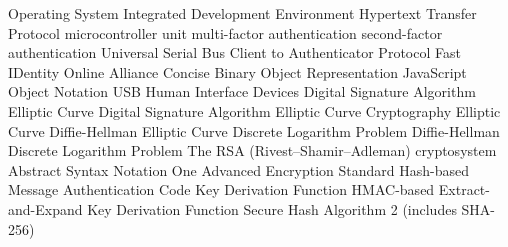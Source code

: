       {Operating System}
     {Integrated Development Environment}
    {Hypertext Transfer Protocol}
     {microcontroller unit}
     {multi-factor authentication}
     {second-factor authentication}
     {Universal Serial Bus}
    {Client to Authenticator Protocol}
    {Fast IDentity Online Alliance}
    {Concise Binary Object Representation}
    {JavaScript Object Notation}
     {USB Human Interface Devices}
     {Digital Signature Algorithm}
   {Elliptic Curve Digital Signature Algorithm}
     {Elliptic Curve Cryptography}
    {Elliptic Curve Diffie-Hellman}
   {Elliptic Curve Discrete Logarithm Problem}
      {Diffie-Hellman}
     {Discrete Logarithm Problem}
     {The RSA (Rivest–Shamir–Adleman) cryptosystem}
   {Abstract Syntax Notation One}
     {Advanced Encryption Standard}
    {Hash-based Message Authentication Code}
     {Key Derivation Function}
    {HMAC-based Extract-and-Expand Key Derivation Function}
   {Secure Hash Algorithm 2 (includes SHA-256)}
